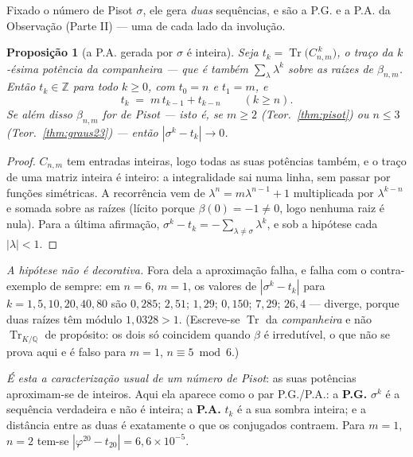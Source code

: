 \documentclass[11pt,a4paper]{article}
\theoremstyle{plain}
\newtheorem{proposicao}[teorema]{Proposição}
\theoremstyle{definition}
\theoremstyle{remark}
\newcommand{\Q}{\mathbb{Q}}
\newcommand{\Z}{\mathbb{Z}}
\providecommand{\Comp}[2]{C_{#1,#2}}
\begin{document}
Fixado o número de Pisot $\sigma$, ele gera \emph{duas} sequências, e são a P.G. e a P.A. da
Observação (Parte II) --- uma de cada lado da involução.

\begin{proposicao}[a P.A. gerada por $\sigma$ é inteira]\label{prop:tracos}
Seja $t_k = \operatorname{Tr}\big(\Comp{n}{m}^{\,k}\big)$, o traço da $k$-ésima potência da
companheira --- que é também $\sum_\lambda \lambda^k$ sobre as raízes de $\beta_{n,m}$. Então
$t_k \in \Z$ para todo $k\geq0$, com $t_0 = n$ e $t_1 = m$, e
\[
  t_k \;=\; m\,t_{k-1} + t_{k-n} \qquad (k \geq n) .
\]
Se além disso $\beta_{n,m}$ for de Pisot --- isto é, se $m\geq2$ (Teor.~\ref{thm:pisot}) ou
$n\leq3$ (Teor.~\ref{thm:graus23}) --- então $|\sigma^k - t_k| \to 0$.
\end{proposicao}

\begin{proof}
$\Comp{n}{m}$ tem entradas inteiras, logo todas as suas potências também, e o traço de uma matriz
inteira é inteiro: a integralidade sai numa linha, sem passar por funções simétricas. A recorrência
vem de $\lambda^n = m\lambda^{n-1}+1$ multiplicada por $\lambda^{k-n}$ e somada sobre as raízes
(lícito porque $\beta(0) = -1 \neq 0$, logo nenhuma raiz é nula). Para a última afirmação,
$\sigma^k - t_k = -\sum_{\lambda\neq\sigma}\lambda^k$, e sob a hipótese cada $|\lambda|<1$.
\end{proof}

\noindent \emph{A hipótese não é decorativa.} Fora dela a aproximação falha, e falha com o
contra-exemplo de sempre: em $n=6$, $m=1$, os valores de $|\sigma^k-t_k|$ para
$k=1,5,10,20,40,80$ são $0{,}285$; $2{,}51$; $1{,}29$; $0{,}150$; $7{,}29$; $26{,}4$ --- diverge,
porque duas raízes têm módulo $1{,}0328>1$. (Escreve-se $\operatorname{Tr}$ da \emph{companheira} e
não $\operatorname{Tr}_{K/\Q}$ de propósito: os dois só coincidem quando $\beta$ é irredutível, o
que não se prova aqui e é falso para $m=1$, $n\equiv5 \bmod 6$.)

\noindent \emph{É esta a caracterização usual de um número de Pisot}: as suas potências aproximam-se
de inteiros. Aqui ela aparece como o par P.G./P.A.: a \textbf{P.G.} $\sigma^k$ é a sequência
verdadeira e não é inteira; a \textbf{P.A.} $t_k$ é a sua sombra inteira; e a distância entre as
duas é exatamente o que os conjugados contraem. Para $m=1$, $n=2$ tem-se
$|\varphi^{20}-t_{20}| = 6{,}6\times10^{-5}$.
\end{document}
